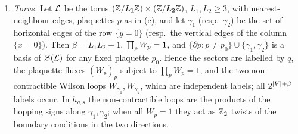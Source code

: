 \begin{theorem}
\begin{enumerate}[label=(\alph*)]
sector $(-1)^{N_f}=\prod_iq_i$.
\item \emph{Torus.}  Let $\mathcal{L}$ be the torus $(\mathbb{Z}/L_1\mathbb{Z})\times(\mathbb{Z}/L_2\mathbb{Z})$, $L_1,L_2\ge3$, with
nearest-neighbour edges, plaquettes $p$ as in (c), and let $\gamma_1$ (resp.\ $\gamma_2$) be the set of
horizontal edges of the row $\{y=0\}$ (resp.\ the vertical edges of the column $\{x=0\}$).  Then
$\beta=L_1L_2+1$, $\prod_pW_p=\mathbf{1}$, and $\{\partial p:p\neq p_0\}\cup\{\gamma_1,\gamma_2\}$ is a basis of
$\mathcal{Z}(\mathcal{L})$ for any fixed plaquette $p_0$.  Hence the sectors are labelled by $q$, the plaquette fluxes
$(W_p)_p$ subject to $\prod_pW_p=1$, and the two non-contractible Wilson loops $W_{\gamma_1},W_{\gamma_2}$,
which are independent labels; all $2^{\left|V\right|+\beta}$ labels occur.  In $h_{q,s}$ the non-contractible loops are the
products of the hopping signs along $\gamma_1,\gamma_2$; when all $W_p=1$ they act as $\mathbb{Z}_2$ twists of the boundary
conditions in the two directions.
\end{enumerate}
\end{theorem}

